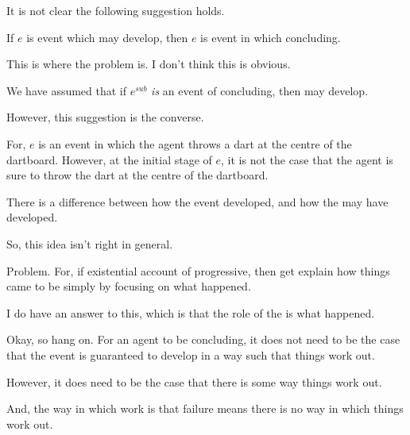 \begin{note}
  It is not clear the following suggestion holds.
  \begin{suggestion}
    If \(e\) is event which may develop, then \(e\) is event in which concluding.

    {
      \color{red}
      This is where the problem is.
      I don't think this is obvious.

      We have assumed that if \(e^{sub}\) \emph{is} an event of concluding, then may develop.

      However, this suggestion is the converse.
    }
  \end{suggestion}
\end{note}

\begin{note}
  For, \(e\) is an event in which the agent throws a dart at the centre of the dartboard.
  However, at the initial stage of \(e\), it is not the case that the agent is sure to throw the dart at the centre of the dartboard.

  There is a difference between how the event developed, and how the may have developed.

  So, this idea isn't right in general.

  Problem.
  For, if existential account of progressive, then get explain how things came to be simply by focusing on what happened.

  I do have an answer to this, which is that the role of the \fc{} is what happened.

  Okay, so hang on.
  For an agent to be concluding, it does not need to be the case that the event is guaranteed to develop in a way such that things work out.

  However, it does need to be the case that there is some way things work out.

  And, the way in which  work is that failure means there is no way in which things work out.
\end{note}

